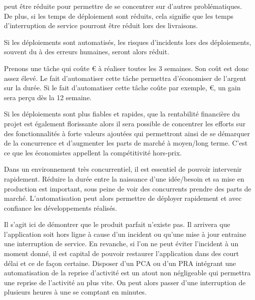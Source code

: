 \begin{description}
	\setlength\itemsep{0em}
	\item [La durée de de déploiement] peut être réduite pour permettre de se concentrer sur d'autres problématiques. De plus, si les temps de déploiement sont réduits, cela signifie que les temps d'interruption de service pourront être réduit lors des livraisons.
	\item [Erreur de déploiement] Si les déploiements sont automatisés, les risques d'incidents lors des déploiements, souvent du à des erreurs humaines, seront alors réduit.
	\item [Rentabilité financière] Prenons une tâche qui coûte € à réaliser toutes les 3 semaines. Son coût est donc assez élevé. Le fait d'automatiser cette tâche permettra d'économiser de l'argent sur la durée. Si le fait d'automatiser cette tâche coûte par exemple, €, un gain sera perçu dès la 12 semaine.
	\item [Part de marché] Si les déploiements sont plus fiables et rapides, que la rentabilité financière du projet est également florissante alors il sera possible de concentrer les efforts sur des fonctionnalités à forte valeurs ajoutées qui permettront ainsi de se démarquer de la concurrence et d'augmenter les parts de marché à moyen/long terme. C'est ce que les économistes appellent la compétitivité hors-prix.
	\item [\Gls{timetomarket}] Dans un environnement très concurrentiel, il est essentiel de pouvoir intervenir rapidement. Réduire la durée entre la naissance d'une idée/besoin et sa mise en production est important, sous peine de voir des concurrents prendre des parts de marché. L'automatisation peut alors permettre de déployer rapidement et avec confiance les développements réalisés.
	\item [Reprise d'activité] Il s'agit ici de démontrer que le produit parfait n'existe pas. Il arrivera que l'application soit hors ligne à cause d'un incident ou qu'une mise à jour entraine une interruption de service. En revanche, si l'on ne peut éviter l'incident à un moment donné, il est capital de pouvoir restaurer l'application dans des court délai et ce de façon certaine. Disposer d'un \gls{PCA} ou d'un \gls{PRA} intégrant une automatisation de la reprise d'activité est un atout non négligeable qui permettra une reprise de l'activité au plus vite. On peut alors passer d'une interruption de plusieurs heures à une se comptant en minutes.
\end{description}

